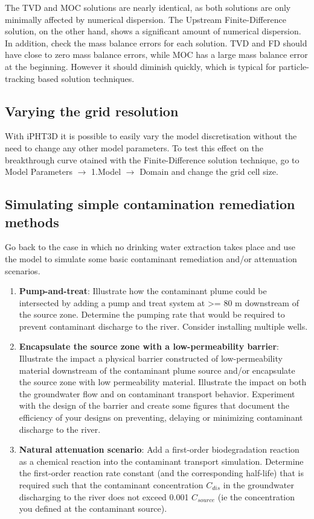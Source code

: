 The TVD and MOC solutions are nearly identical, as both solutions are only 
minimally affected by numerical dispersion. The Upstream Finite-Difference solution, 
on the other hand, shows a significant amount of numerical dispersion.
In addition, check the mass balance errors for each solution. TVD and FD should have
close to zero mass balance errors, while MOC has a large mass balance error at the
beginning. However it should diminish quickly, which is typical for 
particle-tracking based solution techniques.

\subsection{Varying the grid resolution}

With iPHT3D it is possible to easily vary the model discretisation
without the need to change any other model parameters.
To test this effect on the breakthrough curve otained with the Finite-Difference solution technique, 
go to {\color{blue}Model Parameters} $\rightarrow$ {\color{blue}1.Model} 
$\rightarrow$ {\color{blue}Domain} and change the grid cell size.	 

\subsection{Simulating simple contamination remediation methods}
%	 
Go back to the case in which no drinking water extraction takes place and use the model to simulate some basic contaminant remediation and/or attenuation scenarios.
\begin{enumerate}
	\item \textbf{Pump-and-treat}: Illustrate how the contaminant plume could be
      intersected by adding a pump and treat system at >= 80 m downstream of the source zone. Determine the
      pumping rate that would be required to prevent contaminant discharge to the river. Consider 
	  installing multiple wells.
	\item \textbf{Encapsulate the source zone with a low-permeability barrier}: Illustrate
	  the impact a physical barrier constructed of low-permeability material downstream of the contaminant
	  plume source and/or encapsulate the source zone with low permeability material. Illustrate the impact
	  on both the groundwater flow and on contaminant transport behavior. Experiment with the design of 
	  the barrier and create some figures that document the efficiency of your designs on preventing, 
	  delaying or minimizing contaminant discharge to the river.
	\item \textbf{Natural attenuation scenario}: Add a first-order biodegradation reaction as a chemical
	  reaction into the contaminant transport simulation. Determine the first-order reaction rate constant
	  (and the corresponding half-life) that is required such that the contaminant concentration $C_{dis}$ in
	  the groundwater discharging to the river does not exceed 0.001 $C_{source}$ (ie the concentration you
	  defined at the contaminant source).

\end{enumerate}